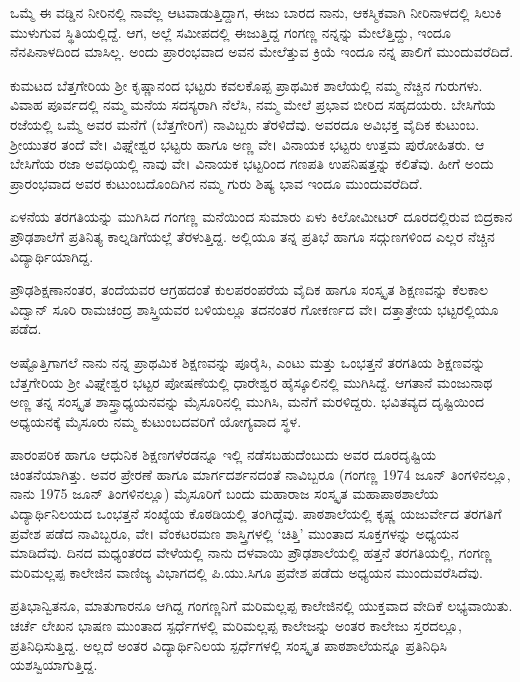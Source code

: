 {ಒಮ್ಮೆ ಈ ವಡ್ಡಿನ ನೀರಿನಲ್ಲಿ ನಾವೆಲ್ಲ ಆಟವಾಡುತ್ತಿದ್ದಾಗ, ಈಜು ಬಾರದ ನಾನು, ಆಕಸ್ಮಿಕವಾಗಿ ನೀರಿನಾಳದಲ್ಲಿ ಸಿಲುಕಿ ಮುಳುಗುವ ಸ್ಥಿತಿಯಲ್ಲಿದ್ದೆ. ಆಗ, ಅಲ್ಲೆ ಸಮೀಪದಲ್ಲಿ ಈಜುತ್ತಿದ್ದ ಗಂಗಣ್ಣ ನನ್ನನ್ನು ಮೇಲೆತ್ತಿದ್ದು, ಇಂದೂ ನೆನಪಿನಾಳದಿಂದ ಮಾಸಿಲ್ಲ. ಅಂದು ಪ್ರಾರಂಭವಾದ ಅವನ ಮೇಲೆತ್ತುವ ಕ್ರಿಯೆ ಇಂದೂ ನನ್ನ ಪಾಲಿಗೆ ಮುಂದು\-ವರೆದಿದೆ.
\vskip 2pt

ಕುಮಟದ ಬೆತ್ತಗೇರಿಯ ಶ್ರೀ ಕೃಷ್ಣಾನಂದ ಭಟ್ಟರು ಕವಲಕೊಪ್ಪ ಪ್ರಾಥಮಿಕ ಶಾಲೆಯಲ್ಲಿ ನಮ್ಮ ನೆಚ್ಚಿನ ಗುರುಗಳು. ವಿವಾಹ ಪೂರ್ವದಲ್ಲಿ ನಮ್ಮ ಮನೆಯ ಸದಸ್ಯರಾಗಿ ನೆಲೆಸಿ, ನಮ್ಮ ಮೇಲೆ ಪ್ರಭಾವ ಬೀರಿದ ಸಹೃದಯರು. ಬೇಸಿಗೆಯ ರಜೆಯಲ್ಲಿ ಒಮ್ಮೆ ಅವರ ಮನೆಗೆ (ಬೆತ್ತಗೇರಿಗೆ) ನಾವಿಬ್ಬರು ತೆರಳಿದೆವು. ಅವರದೂ ಅವಿಭಕ್ತ ವೈದಿಕ ಕುಟುಂಬ. ಶ್ರೀಯುತರ ತಂದೆ ವೇ। ವಿಘ್ನೇಶ್ವರ ಭಟ್ಟರು ಹಾಗೂ ಅಣ್ಣ ವೇ। ವಿನಾಯಕ ಭಟ್ಟರು ಉತ್ತಮ ಪುರೋಹಿತರು. ಆ ಬೇಸಿಗೆಯ ರಜಾ ಅವಧಿಯಲ್ಲಿ ನಾವು ವೇ। ವಿನಾಯಕ ಭಟ್ಟರಿಂದ ಗಣಪತಿ ಉಪನಿಷತ್ತನ್ನು ಕಲಿತೆವು. ಹೀಗೆ ಅಂದು ಪ್ರಾರಂಭವಾದ ಅವರ ಕುಟುಂಬದೊಂದಿಗಿನ ನಮ್ಮ ಗುರು  \enginline{-}  ಶಿಷ್ಯ ಭಾವ ಇಂದೂ ಮುಂದುವರೆದಿದೆ. 
\vskip 2pt

ಏಳನೆಯ ತರಗತಿಯನ್ನು ಮುಗಿಸಿದ ಗಂಗಣ್ಣ ಮನೆಯಿಂದ ಸುಮಾರು ಏಳು ಕಿಲೋಮೀಟರ್ ದೂರದಲ್ಲಿರುವ ಬಿದ್ರಕಾನ ಪ್ರೌಢಶಾಲೆಗೆ ಪ್ರತಿನಿತ್ಯ ಕಾಲ್ನಡಿಗೆಯಲ್ಲೆ ತೆರಳುತ್ತಿದ್ದ. ಅಲ್ಲಿಯೂ ತನ್ನ ಪ್ರತಿಭೆ ಹಾಗೂ ಸದ್ಗುಣಗಳಿಂದ ಎಲ್ಲರ ನೆಚ್ಚಿನ ವಿದ್ಯಾರ್ಥಿಯಾಗಿದ್ದ.
\vskip 2pt

ಪ್ರೌಢಶಿಕ್ಷಣಾನಂತರ, ತಂದೆಯವರ ಆಗ್ರಹದಂತೆ ಕುಲಪರಂಪರೆಯ ವೈದಿಕ ಹಾಗೂ ಸಂಸ್ಕೃತ ಶಿಕ್ಷಣವನ್ನು ಕೆಲಕಾಲ ವಿದ್ವಾನ್ ಸೂರಿ ರಾಮಚಂದ್ರ ಶಾಸ್ತ್ರಿಯವರ ಬಳಿಯಲ್ಲೂ ತದನಂತರ ಗೋಕರ್ಣದ ವೇ। ದತ್ತಾತ್ರೇಯ ಭಟ್ಟರಲ್ಲಿಯೂ ಪಡೆದ.

ಅಷ್ಟೊತ್ತಿಗಾಗಲೆ ನಾನು ನನ್ನ ಪ್ರಾಥಮಿಕ ಶಿಕ್ಷಣವನ್ನು ಪೂರೈಸಿ, ಎಂಟು ಮತ್ತು ಒಂಭತ್ತನೆ ತರಗತಿಯ ಶಿಕ್ಷಣವನ್ನು ಬೆತ್ತಗೇರಿಯ ಶ್ರೀ ವಿಘ್ನೇಶ್ವರ ಭಟ್ಟರ ಪೋಷಣೆಯಲ್ಲಿ ಧಾರೇಶ್ವರ ಹೈಸ್ಕೂಲಿನಲ್ಲಿ ಮುಗಿಸಿದ್ದೆ. ಆಗತಾನೆ ಮಂಜುನಾಥ ಅಣ್ಣ ತನ್ನ ಸಂಸ್ಕೃತ  \enginline{-}   ಶಾಸ್ತ್ರಾಧ್ಯಯನವನ್ನು ಮೈಸೂರಿನಲ್ಲಿ ಮುಗಿಸಿ, ಮನೆಗೆ ಮರಳಿದ್ದರು. ಭವಿತವ್ಯದ ದೃಷ್ಟಿಯಿಂದ ಅಧ್ಯಯನಕ್ಕೆ ಮೈಸೂರು ನಮ್ಮ ಕುಟುಂಬದವರಿಗೆ ಯೋಗ್ಯವಾದ ಸ್ಥಳ.

ಪಾರಂಪರಿಕ ಹಾಗೂ ಆಧುನಿಕ ಶಿಕ್ಷಣಗಳೆರಡನ್ನೂ ಇಲ್ಲಿ ನಡೆಸಬಹುದೆಂಬುದು ಅವರ ದೂರದೃಷ್ಟಿಯ ಚಿಂತನೆಯಾಗಿತ್ತು. ಅವರ ಪ್ರೇರಣೆ ಹಾಗೂ ಮಾರ್ಗದರ್ಶನದಂತೆ ನಾವಿಬ್ಬರೂ (ಗಂಗಣ್ಣ 1974 ಜೂನ್ ತಿಂಗಳಿ\-ನಲ್ಲೂ, ನಾನು 1975 ಜೂನ್ ತಿಂಗಳಿ\-ನಲ್ಲೂ) ಮೈಸೂರಿಗೆ ಬಂದು ಮಹಾರಾಜ ಸಂಸ್ಕೃತ ಮಹಾಪಾಠಶಾಲೆಯ ವಿದ್ಯಾರ್ಥಿನಿಲಯದ ಒಂಭತ್ತನೆ ಸಂಖ್ಯೆಯ ಕೊಠಡಿಯಲ್ಲಿ ತಂಗಿದ್ದೆವು. ಪಾಠಶಾಲೆಯಲ್ಲಿ ಕೃಷ್ಣ ಯಜುರ್ವೇದ ತರಗತಿಗೆ ಪ್ರವೇಶ ಪಡೆದ ನಾವಿಬ್ಬರೂ, ವೇ। ವೆಂಕಟರಮಣ ಶಾಸ್ತ್ರಿಗಳಲ್ಲಿ ‘ಚಿತ್ತಿ’ ಮುಂತಾದ ಸೂಕ್ತಗಳನ್ನು ಅಧ್ಯಯನ ಮಾಡಿದೆವು. ದಿನದ ಮಧ್ಯಂತರದ ವೇಳೆಯಲ್ಲಿ ನಾನು ದಳವಾಯಿ ಪ್ರೌಢಶಾಲೆಯಲ್ಲಿ ಹತ್ತನೆ ತರಗತಿಯಲ್ಲಿ, ಗಂಗಣ್ಣ ಮರಿಮಲ್ಲಪ್ಪ ಕಾಲೇಜಿನ ವಾಣಿಜ್ಯ ವಿಭಾಗದಲ್ಲಿ ಪಿ.ಯು.ಸಿಗೂ ಪ್ರವೇಶ ಪಡೆದು ಅಧ್ಯಯನ ಮುಂದುವರೆಸಿದೆವು.

ಪ್ರತಿಭಾನ್ವಿತನೂ, ಮಾತುಗಾರನೂ ಆಗಿದ್ದ ಗಂಗಣ್ಣನಿಗೆ ಮರಿಮಲ್ಲಪ್ಪ ಕಾಲೇಜಿನಲ್ಲಿ ಯುಕ್ತವಾದ ವೇದಿಕೆ ಲಭ್ಯವಾಯಿತು. ಚರ್ಚೆ  \enginline{-}  ಲೇಖನ  \enginline{-}  ಭಾಷಣ ಮುಂತಾದ ಸ್ಪರ್ಧೆಗಳಲ್ಲಿ ಮರಿಮಲ್ಲಪ್ಪ ಕಾಲೇಜನ್ನು ಅಂತರ ಕಾಲೇಜು ಸ್ತರದಲ್ಲೂ, ಪ್ರತಿನಿಧಿಸುತ್ತಿದ್ದ. ಅಲ್ಲದೆ ಅಂತರ ವಿದ್ಯಾರ್ಥಿನಿಲಯ ಸ್ಪರ್ಧೆಗಳಲ್ಲಿ ಸಂಸ್ಕೃತ ಪಾಠಶಾಲೆಯನ್ನೂ ಪ್ರತಿ\-ನಿಧಿಸಿ ಯಶಸ್ವಿ\-ಯಾಗುತ್ತಿದ್ದ. 

}
